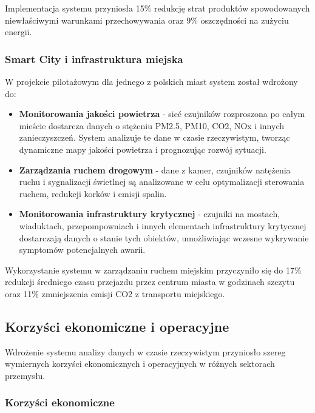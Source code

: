 Implementacja systemu przyniosła 15\% redukcję strat produktów spowodowanych niewłaściwymi warunkami przechowywania oraz 9\% oszczędności na zużyciu energii.

\subsubsection{Smart City i infrastruktura miejska}
\label{subsubsec:smart_city}

W projekcie pilotażowym dla jednego z polskich miast system został wdrożony do:

\begin{itemize}
    \item \textbf{Monitorowania jakości powietrza} - sieć czujników rozproszona po całym mieście dostarcza danych o stężeniu PM2.5, PM10, CO2, NOx i innych zanieczyszczeń. System analizuje te dane w czasie rzeczywistym, tworząc dynamiczne mapy jakości powietrza i prognozując rozwój sytuacji.
    \item \textbf{Zarządzania ruchem drogowym} - dane z kamer, czujników natężenia ruchu i sygnalizacji świetlnej są analizowane w celu optymalizacji sterowania ruchem, redukcji korków i emisji spalin.
    \item \textbf{Monitorowania infrastruktury krytycznej} - czujniki na mostach, wiaduktach, przepompowniach i innych elementach infrastruktury krytycznej dostarczają danych o stanie tych obiektów, umożliwiając wczesne wykrywanie symptomów potencjalnych awarii.
\end{itemize}

Wykorzystanie systemu w zarządzaniu ruchem miejskim przyczyniło się do 17\% redukcji średniego czasu przejazdu przez centrum miasta w godzinach szczytu oraz 11\% zmniejszenia emisji CO2 z transportu miejskiego.

\subsection{Korzyści ekonomiczne i operacyjne}
\label{subsec:korzysci}

Wdrożenie systemu analizy danych w czasie rzeczywistym przyniosło szereg wymiernych korzyści ekonomicznych i operacyjnych w różnych sektorach przemysłu.

\subsubsection{Korzyści ekonomiczne}
\label{subsubsec:korzysci_ekonomiczne}

